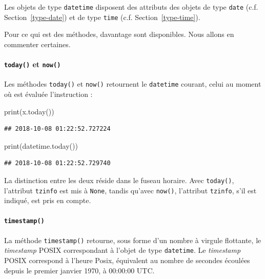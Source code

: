 \documentclass[12pt,]{book}
\newenvironment{Shaded}{\begin{snugshade}}{\end{snugshade}}
\newcommand{\BuiltInTok}[1]{#1}
\newcommand{\NormalTok}[1]{#1}
\let\oldparagraph\paragraph
\renewcommand{\paragraph}[1]{\oldparagraph{#1}\mbox{}}
\numberwithin{equation}{section}
\numberwithin{countremarque}{section}
\begin{document}
Les objets de type \texttt{datetime} disposent des attributs des objets
de type \texttt{date} (c.f. Section~\ref{type-date}) et de type
\texttt{time} (c.f. Section~\ref{type-time}).

Pour ce qui est des méthodes, davantage sont disponibles. Nous allons en
commenter certaines.

\paragraph{\texorpdfstring{\texttt{today()} et
\texttt{now()}}{today() et now()}}\label{today-et-now}

Les méthodes \texttt{today()} et \texttt{now()} retournent le
\texttt{datetime} courant, celui au moment où est évaluée l'instruction
:

\begin{Shaded}
\begin{Highlighting}[]
\BuiltInTok{print}\NormalTok{(x.today())}
\end{Highlighting}
\end{Shaded}

\begin{lstlisting}
## 2018-10-08 01:22:52.727224
\end{lstlisting}

\begin{Shaded}
\begin{Highlighting}[]
\BuiltInTok{print}\NormalTok{(datetime.today())}
\end{Highlighting}
\end{Shaded}

\begin{lstlisting}
## 2018-10-08 01:22:52.729740
\end{lstlisting}

La distinction entre les deux réside dans le fuseau horaire. Avec
\texttt{today()}, l'attribut \texttt{tzinfo} est mis à \texttt{None},
tandis qu'avec \texttt{now()}, l'attribut \texttt{tzinfo}, s'il est
indiqué, est pris en compte.

\paragraph{\texorpdfstring{\texttt{timestamp()}}{timestamp()}}\label{timestamp}

La méthode \texttt{timestamp()} retourne, sous forme d'un nombre à
virgule flottante, le \emph{timestamp} POSIX correspondant à l'objet de
type \texttt{datetime}. Le \emph{timestamp} POSIX correspond à l'heure
Posix, équivalent au nombre de secondes écoulées depuis le premier
janvier 1970, à 00:00:00 UTC.
\end{document}
